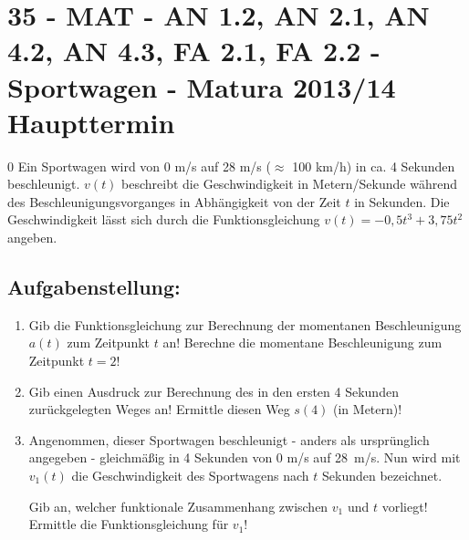 \section{35 - MAT - AN 1.2, AN 2.1, AN 4.2, AN 4.3, FA 2.1, FA 2.2 - Sportwagen - Matura 2013/14 Haupttermin}

\begin{langesbeispiel} \item[0] %
				Ein Sportwagen wird von 0 m/s auf 28 m/s ($\approx$ 100 km/h) in ca. 4 Sekunden beschleunigt. $v(t)$ beschreibt die Geschwindigkeit in Metern/Sekunde während des Beschleunigungsvorganges in Abhängigkeit von der Zeit $t$ in Sekunden. Die Geschwindigkeit lässt sich durch die Funktionsgleichung $v(t)=-0,5t^3+3,75t^2$ angeben.

\subsection{Aufgabenstellung:}
\begin{enumerate}
	\item {}  Gib die Funktionsgleichung zur Berechnung der momentanen Beschleunigung $a(t)$ zum Zeitpunkt $t$ an!  Berechne die momentane Beschleunigung zum Zeitpunkt $t=2$!
	
	\item  Gib einen Ausdruck zur Berechnung des in den ersten 4 Sekunden zurückgelegten Weges an! Ermittle diesen Weg $s(4)$ (in Metern)!
	
	\item  Angenommen, dieser Sportwagen beschleunigt - anders als ursprünglich angegeben - gleichmäßig in 4 Sekunden von 0 m/s auf 28 m/s. Nun wird mit $v_1(t)$ die Geschwindigkeit des Sportwagens nach $t$ Sekunden bezeichnet.
	
	Gib an, welcher funktionale Zusammenhang zwischen $v_1$ und $t$ vorliegt! Ermittle die Funktionsgleichung für $v_1$!
						\end{enumerate}\leer
				
\end{langesbeispiel}
